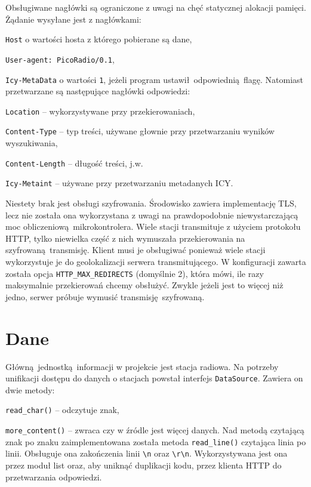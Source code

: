 \documentclass[polish]{aghengthesis}
\let\tempone\itemize
\let\temptwo\enditemize
\renewenvironment{itemize}{\tempone\setlength{\itemsep}{0cm}}{\temptwo}
\begin{document}
		Obsługiwane nagłówki są ograniczone z uwagi na chęć statycznej alokacji pamięci. Żądanie wysyłane jest z nagłówkami:
		\begin{itemize}
			\item \lstinline|Host| o wartości hosta z którego pobierane są dane,
			\item \lstinline|User-agent: PicoRadio/0.1|,
			\item \lstinline|Icy-MetaData| o wartości \lstinline|1|, jeżeli program ustawił odpowiednią flagę.
		\end{itemize}
		Natomiast przetwarzane są następujące nagłówki odpowiedzi:
		\begin{itemize}
			\item \lstinline|Location| -- wykorzystywane przy przekierowaniach,
			\item \lstinline|Content-Type| -- typ treści, używane głownie przy przetwarzaniu wyników wyszukiwania,
			\item \lstinline|Content-Length| -- długość treści, j.w.
			\item \lstinline|Icy-Metaint| -- używane przy przetwarzaniu metadanych ICY.
		\end{itemize}
		
		Niestety brak jest obsługi szyfrowania. Środowisko zawiera implementację TLS, lecz nie została ona wykorzystana z uwagi na prawdopodobnie niewystarczającą moc obliczeniową mikrokontrolera. Wiele stacji transmituje z użyciem protokołu HTTP, tylko niewielka część z nich wymuszała przekierowania na szyfrowaną transmisję. Klient musi je obsługiwać ponieważ wiele stacji wykorzystuje je do geolokalizacji serwera transmitującego. W konfiguracji zawarta została opcja \lstinline|HTTP_MAX_REDIRECTS| (domyślnie 2), która mówi, ile razy maksymalnie przekierowań chcemy obsłużyć. Zwykle jeżeli jest to więcej niż jedno, serwer próbuje wymusić transmisję szyfrowaną.
		
	\section{Dane}
		Główną jednostką informacji w projekcie jest stacja radiowa. Na potrzeby unifikacji dostępu do danych o stacjach powstał interfejs \lstinline|DataSource|. Zawiera on dwie metody:
		\begin{itemize}
			\item \lstinline|read_char()| -- odczytuje znak,
			\item \lstinline|more_content()| -- zwraca czy w źródle jest więcej danych.
		\end{itemize}
		Nad metodą czytającą znak po znaku zaimplementowana została metoda \lstinline|read_line()| czytająca linia po linii. Obsługuje ona zakończenia linii \lstinline|\n| oraz \lstinline|\r\n|. Wykorzystywana jest ona przez moduł list oraz, aby uniknąć duplikacji kodu, przez klienta HTTP do przetwarzania odpowiedzi.
		
\end{document}
